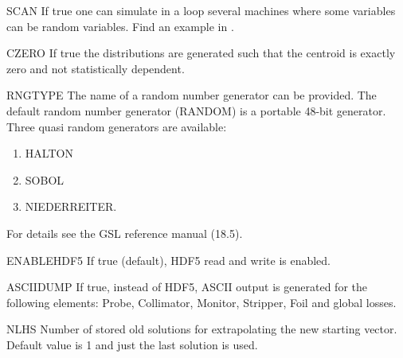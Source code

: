 \begin{kdescription}

  \item[SCAN]
  If true one can simulate in a loop several machines where some variables can be random variables. Find an
  example in .

  \item[CZERO]
  If true the distributions are generated such that the centroid is exactly zero and not statistically dependent.

  \item[RNGTYPE]
  The name  of a random number generator can be provided. The default random number generator (RANDOM) is a portable 48-bit generator. Three quasi random generators are available:
  \begin{enumerate}
    \item HALTON
    \item SOBOL
    \item NIEDERREITER.
  \end{enumerate}
  For details see the GSL reference manual (18.5).

  \item[ENABLEHDF5]
  If true (default), HDF5 read and write is enabled.

  \item[ASCIIDUMP]
  If true, instead of HDF5, ASCII output is generated for the following elements: Probe, Collimator, Monitor, Stripper, Foil and global losses.

  \item[NLHS]
  Number of stored old solutions for extrapolating the new starting vector. Default value is 1 and just the last solution is used.


\end{kdescription}
